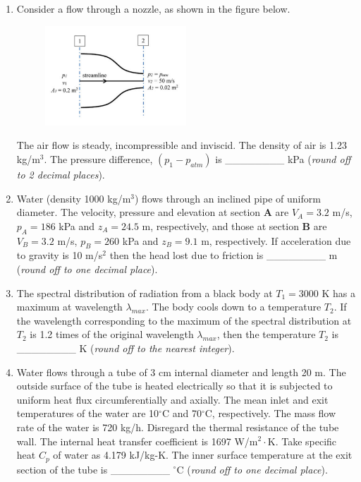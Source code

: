 \documentclass[12pt,onecolumn]{article}
\begin{document}
\begin{enumerate}
    \item Consider a flow through a nozzle, as shown in the figure below.
          \begin{figure}[H]
              \centering
              \includegraphics[width=0.5\textwidth]{q48s2}
              \label{fig:q48s2}
          \end{figure}
          The air flow is steady, incompressible and inviscid. The density of air is 1.23 kg/m$^3$. The pressure difference, $(p_1 - p_{atm})$ is \_\_\_\_\_\_\_\_ kPa (\textit{round off to 2 decimal places}).

    \item Water (density 1000 kg/m$^3$) flows through an inclined pipe of uniform diameter. The velocity, pressure and elevation at section $\mathbf{A}$ are $V_A = 3.2$ m/s, $p_A = 186$ kPa and $z_A = 24.5$ m, respectively, and those at section $\mathbf{B}$ are $V_B = 3.2$ m/s, $p_B = 260$ kPa and $z_B = 9.1$ m, respectively. If acceleration due to gravity is 10 m/s$^2$ then the head lost due to friction is \_\_\_\_\_\_\_\_ m (\textit{round off to one decimal place}).

    \item The spectral distribution of radiation from a black body at $T_1 = 3000$ K has a maximum at wavelength $\lambda_{max}$. The body cools down to a temperature $T_2$. If the wavelength corresponding to the maximum of the spectral distribution at $T_2$ is 1.2 times of the original wavelength $\lambda_{max}$, then the temperature $T_2$ is \_\_\_\_\_\_\_\_ K (\textit{round off to the nearest integer}).

    \item Water flows through a tube of 3 cm internal diameter and length 20 m. The outside surface of the tube is heated electrically so that it is subjected to uniform heat flux circumferentially and axially. The mean inlet and exit temperatures of the water are 10$^\circ$C and 70$^\circ$C, respectively. The mass flow rate of the water is 720 kg/h. Disregard the thermal resistance of the tube wall. The internal heat transfer coefficient is 1697 W/m$^2\cdot$K. Take specific heat $C_p$ of water as 4.179 kJ/kg-K. The inner surface temperature at the exit section of the tube is \_\_\_\_\_\_\_\_ $^\circ$C (\textit{round off to one decimal place}).


\end{enumerate}
\end{document}
